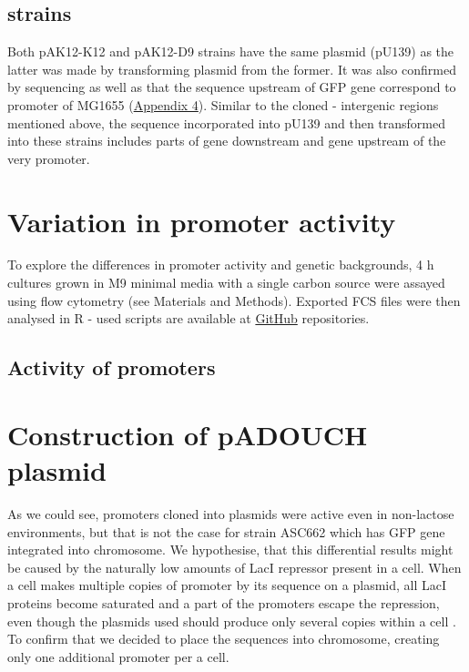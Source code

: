 \subsection{ strains}
Both pA\textunderscore K12-K12 and pA\textunderscore K12-D9 strains have the same plasmid (pU139) as the latter was made by transforming plasmid from the former.
It was also confirmed by sequencing as well as that the sequence upstream of GFP gene correspond to  promoter of MG1655 (\hyperlink{precAalign}{Appendix 4}).
Similar to the cloned - intergenic regions mentioned above, the sequence incorporated into pU139 and then transformed into these  strains includes parts of  gene downstream and  gene upstream of the very promoter.


\section{Variation in promoter activity}
To explore the differences in promoter activity and genetic backgrounds, 4 h cultures grown in M9 minimal media with a single carbon source were assayed using flow cytometry (see Materials and Methods).
Exported FCS files were then analysed in R - used scripts are available at \href{https://github.com/marketavlkova/}{GitHub} repositories.

\subsection{Activity of  promoters}




\section{Construction of pADOUCH plasmid}
As we could see,  promoters cloned into plasmids were active even in non-lactose environments, but that is not the case for strain ASC662 which has GFP gene integrated into chromosome.
We hypothesise, that this differential results might be caused by the naturally low amounts of LacI repressor present in a cell.
When a cell makes multiple copies of  promoter by its sequence on a plasmid, all LacI proteins become saturated and a part of the promoters escape the repression, even though the plasmids used should produce only several copies within a cell \cite{zaslaver2006comprehensive}.
To confirm that we decided to place the  sequences into chromosome, creating only one additional  promoter per a cell.


